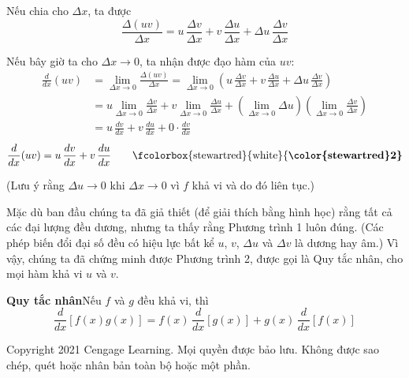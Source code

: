 \begin{minipage}[t]{0.71\textwidth}
    Nếu chia cho $\Delta x$, ta được
    \[
    \frac{\Delta(uv)}{\Delta x} = u\,\frac{\Delta v}{\Delta x} + v\,\frac{\Delta u}{\Delta x} + \Delta u\,\frac{\Delta v}{\Delta x}
    \]

    Nếu bây giờ ta cho $\Delta x \to 0$, ta nhận được đạo hàm của $uv$:
    \begin{align*}
    \frac{d}{dx}(uv) &= \lim_{\Delta x \to 0} \frac{\Delta(uv)}{\Delta x} = \lim_{\Delta x \to 0} \left( u\,\frac{\Delta v}{\Delta x} + v\,\frac{\Delta u}{\Delta x} + \Delta u\,\frac{\Delta v}{\Delta x} \right) \\[6pt]
    &= u \lim_{\Delta x \to 0} \frac{\Delta v}{\Delta x} + v \lim_{\Delta x \to 0} \frac{\Delta u}{\Delta x} + \left( \lim_{\Delta x \to 0} \Delta u \right) \left( \lim_{\Delta x \to 0} \frac{\Delta v}{\Delta x} \right) \\[6pt]
    &= u\,\frac{dv}{dx} + v\,\frac{du}{dx} + 0 \cdot \frac{dv}{dx}
    \end{align*}
    \begin{equation}
    \frac{d}{dx}(uv) = u\,\frac{dv}{dx} + v\,\frac{du}{dx} \tag*{\fboxsep=2.5pt\fcolorbox{stewartred}{white}{\bfseries\color{stewartred}2}}
    \end{equation}

    (Lưu ý rằng $\Delta u \to 0$ khi $\Delta x \to 0$ vì $f$ khả vi và do đó liên tục.)

    Mặc dù ban đầu chúng ta đã giả thiết (để giải thích bằng hình học) rằng tất cả các đại lượng đều dương, nhưng ta thấy rằng Phương trình 1 luôn đúng. (Các phép biến đổi đại số đều có hiệu lực bất kể $u$, $v$, $\Delta u$ và $\Delta v$ là dương hay âm.) Vì vậy, chúng ta đã chứng minh được Phương trình 2, được gọi là Quy tắc nhân, cho mọi hàm khả vi $u$ và $v$.

    \begin{definitionbox}
    \noindent\textbf{\textsf{\color{stewartred}Quy tắc nhân}}\quad \textsf{Nếu $f$ và $g$ đều khả vi, thì}
    \[
    \frac{d}{dx} [f(x)g(x)] = f(x)\,\frac{d}{dx} [g(x)] + g(x)\,\frac{d}{dx} [f(x)]
    \]
    \end{definitionbox}
\end{minipage}

\vfill
{\tiny\color{stewartgray}\noindent Copyright 2021 Cengage Learning. Mọi quyền được bảo lưu. Không được sao chép, quét hoặc nhân bản toàn bộ hoặc một phần.}
